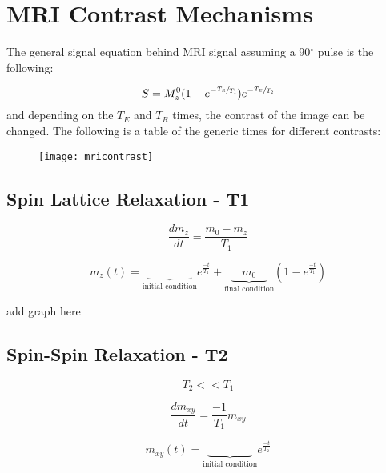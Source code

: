 \section{MRI Contrast Mechanisms}

The general signal equation behind MRI signal assuming a 90$^\circ$ pulse is the following:

\begin{equation}
S = M_z^0(1-e^{-\sfrac{T_R}{T_1}})e^{-\sfrac{T_E}{T_2}}
\end{equation}
and depending on the $T_E$ and $T_R$ times, the contrast of the image can be changed. The following is a table of the generic times for different contrasts:

\begin{figure}[h]
	\begin{center}
		\texttt{[image: mricontrast]}	
	\end{center}
\end{figure}

\subsection{Spin Lattice Relaxation - T1}
\begin{equation}
\frac{dm_z}{dt}= \frac{m_0-m_z}{T_1}
\end{equation}

\begin{equation}
m_z(t) = \underset{\text{initial condition}}{\underbrace{\qquad\qquad}} e^{\frac{-t}{T_1}} + \underset{\text{final condition}}{\underbrace{\quad m_0\quad}}\left(1-e^{\frac{-t}{T_1}}\right)
\end{equation}

add graph here


\subsection{Spin-Spin Relaxation - T2}
\begin{equation}
T_2 << T_1
\end{equation}

\begin{equation}
\frac{dm_{xy}}{dt}= \frac{-1}{T_1}m_{xy}
\end{equation}

\begin{equation}
m_{xy}(t) = \underset{\text{initial condition}}{\underbrace{\qquad\qquad}} e^{\frac{-t}{T_2}}
\end{equation}

